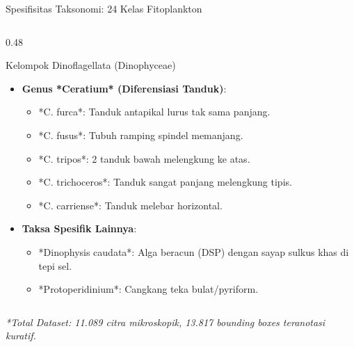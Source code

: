 \documentclass[aspectratio=169, 10pt]{beamer}
\begin{document}
\begin{frame}{Spesifisitas Taksonomi: 24 Kelas Fitoplankton}
\begin{columns}[T]
        \begin{column}{0.48\textwidth}
            \begin{conceptcard}{Kelompok Dinoflagellata (Dinophyceae)}
                \scriptsize
                \begin{itemize}\setlength\itemsep{2pt}
                    \item \textbf{Genus *Ceratium* (Diferensiasi Tanduk)}:
                        \begin{itemize}\scriptsize
                            \item *C. furca*: Tanduk antapikal lurus tak sama panjang.
                            \item *C. fusus*: Tubuh ramping spindel memanjang.
                            \item *C. tripos*: 2 tanduk bawah melengkung ke atas.
                            \item *C. trichoceros*: Tanduk sangat panjang melengkung tipis.
                            \item *C. carriense*: Tanduk melebar horizontal.
                        \end{itemize}
                    \item \textbf{Taksa Spesifik Lainnya}:
                        \begin{itemize}\scriptsize
                            \item *Dinophysis caudata*: Alga beracun (DSP) dengan sayap sulkus khas di tepi sel.
                            \item *Protoperidinium*: Cangkang teka bulat/pyriform.
                        \end{itemize}
                \end{itemize}
            \end{conceptcard}
        \end{column}
    \end{columns}
    \vspace{2pt}
    \scriptsize\textit{*Total Dataset: 11.089 citra mikroskopik, 13.817 bounding boxes teranotasi kuratif.}
\end{frame}

\end{document}
